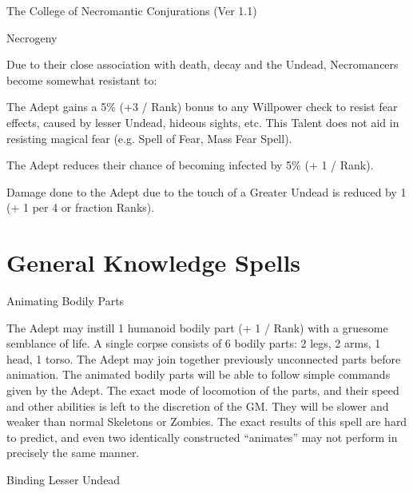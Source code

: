 \begin{Chapter}{The College of Necromantic Conjurations (Ver 1.1)}
\begin{talent}[T-3]{Necrogeny}
\begin{effects}
Due to their close association with death, decay and the Undead,
Necromancers become somewhat resistant to:
\begin{Description}
\item[Fear Effects] The Adept gains a 5\% (+3 / Rank) bonus to any
  Willpower check to resist fear effects, caused by lesser Undead,
  hideous sights, etc.  This Talent does not aid in resisting magical
  fear (e.g.  Spell of Fear, Mass Fear Spell).

\item[Infection] The Adept reduces their chance of becoming infected
  by 5\% (+ 1 / Rank).

\item[Undead Draining] Damage done to the Adept due to the touch of a
Greater Undead is reduced by 1 (+ 1 per 4 or fraction Ranks).
\end{Description}
\end{effects}
\end{talent}

\section{General Knowledge Spells}

\begin{spell}[G-1]{Animating Bodily Parts}

\begin{effects}
The Adept may instill 1 humanoid bodily part (+ 1 / Rank) with a
gruesome semblance of life.  A single corpse consists of 6 bodily
parts: 2 legs, 2 arms, 1 head, 1 torso.  The Adept may join together
previously unconnected parts before animation.  The animated bodily
parts will be able to follow simple commands given by the Adept.  The
exact mode of locomotion of the parts, and their speed and other
abilities is left to the discretion of the GM.  They will be slower
and weaker than normal Skeletons or Zombies. The exact results of this
spell are hard to predict, and even two identically constructed
“animates” may not perform in precisely the same manner.
\end{effects}
\end{spell}

\begin{spell}[G-2]{Binding Lesser Undead}


\end{spell}
\end{Chapter}
